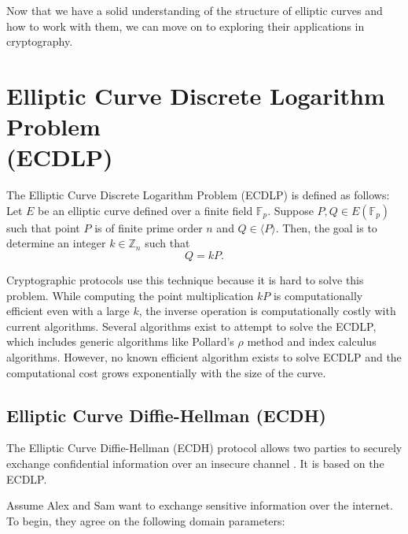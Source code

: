 \documentclass[11pt]{article}
\begin{document}
\vspace{0.3cm}

Now that we have a solid understanding of the structure of elliptic curves and how to work with them, we can move on to exploring their applications in cryptography.

\section{Elliptic Curve Discrete Logarithm Problem\\ (ECDLP)}

The Elliptic Curve Discrete Logarithm Problem (ECDLP) \cite{menezes} is defined as follows: Let \(E\) be an elliptic curve defined over a finite field \(\mathbb{F}_p\). Suppose \(P, Q \in E(\mathbb{F}_p)\) such that point \(P\) is of finite prime order \(n\) and \(Q \in \langle P \rangle\). Then, the goal is to determine an integer \(k \in \mathbb{Z}_n\) such that
\[Q = kP.\] 

Cryptographic protocols use this technique because it is hard to solve this problem. While computing the point multiplication \(kP\) is computationally efficient even with a large \(k\), the inverse operation is computationally costly with current algorithms. Several algorithms exist to attempt to solve the ECDLP, which includes generic algorithms like Pollard's \(\rho\) method and index calculus algorithms. However, no known efficient algorithm exists to solve ECDLP and the computational cost grows exponentially with the size of the curve. 




\subsection{Elliptic Curve Diffie-Hellman (ECDH)}

The Elliptic Curve Diffie-Hellman (ECDH) protocol allows two parties to securely exchange confidential information over an insecure channel \cite{shevchuk}. It is based on the ECDLP.

\vspace{0.3cm}

Assume Alex and Sam want to exchange sensitive information over the internet. To begin, they agree on the following domain parameters:
\end{document}
